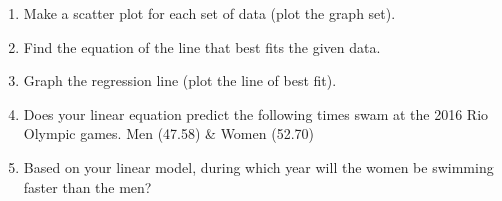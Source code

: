 \documentclass[a4paper, 11pt]{article}
\begin{document}
\begin{enumerate}
\item  Make a scatter plot for each set of data (plot the graph set).
\item  Find the equation of the line that best fits the given data.
\item  Graph the regression line (plot the line of best fit).
\item  Does your linear equation predict the following times swam at the 2016 Rio Olympic games. Men (47.58) \& Women (52.70)
\item  Based on your linear model, during which year will the women be swimming faster than the men?
\end{enumerate}
\end{document}
